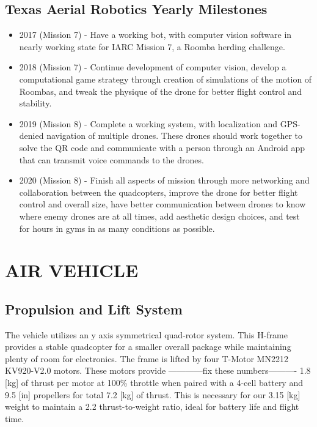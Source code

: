 \documentclass[12pt,letterpaper]{article}
\begin{document}
	\pagebreak
	\subsection*{Texas Aerial Robotics Yearly Milestones}

	\begin{itemize}

		\item 2017 (Mission 7) - Have a working bot, with computer vision software in nearly working state for IARC Mission 7, a Roomba herding challenge. 

		\item 2018 (Mission 7) - Continue development of computer vision, develop a computational game strategy through creation of simulations of the motion of Roombas, and tweak the physique of the drone for better flight control and stability. 

		\item 2019 (Mission 8) - Complete a working system, with localization and GPS-denied navigation of multiple drones. These drones should work together to solve the QR code and communicate with a person through an Android app that can transmit voice commands to the drones.

		\item 2020 (Mission 8) - Finish all aspects of mission through more networking and collaboration between the quadcopters, improve the drone for better flight control and overall size, have better communication between drones to know where enemy drones are at all times, add aesthetic design choices, and test for hours in gyms in as many conditions as possible.
	\end{itemize}

\section*{AIR VEHICLE}
	\subsection*{Propulsion and Lift System}
			The vehicle utilizes an y axis symmetrical quad-rotor system. This H-frame provides a stable quadcopter for a smaller overall package while maintaining plenty of room for electronics. The frame is lifted by four T-Motor MN2212 KV920-V2.0 motors. These motors provide
			------------fix these numbers---------- 1.8 [kg] of thrust per motor at 100\% throttle when paired with a 4-cell battery and 9.5 [in] propellers for total 7.2 [kg] of thrust. This is necessary for our 3.15 [kg] weight to maintain a 2.2 thrust-to-weight ratio, ideal for battery life and flight time.
\end{document}

